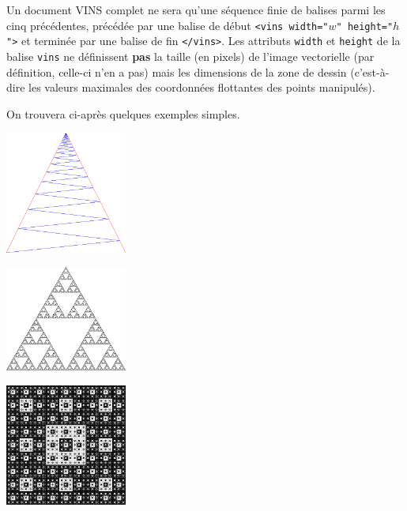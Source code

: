 \documentclass[10pt, a4paper]{article}
\begin{document}
Un document VINS complet ne sera qu'une séquence finie de balises
parmi les cinq précédentes, précédée par une balise de début
\texttt{<vins width="$w$" height="$h$">} et terminée par une balise de
fin \texttt{</vins>}. Les attributs \texttt{width} et \texttt{height}
de la balise \texttt{vins} ne définissent \textbf{pas} la taille (en pixels) de
l'image vectorielle (par définition, celle-ci n'en a pas) mais les
dimensions de la zone de dessin (c'est-à-dire les valeurs maximales des coordonnées flottantes des points manipulés).

On trouvera ci-après quelques exemples simples.

\begin{multicols}{2}


\hspace{3cm}\includegraphics[width=4cm]{zigzag.png}
\end{multicols}

\begin{multicols}{2}


\hspace{3cm}\includegraphics[width=4cm]{sierp.png}
\end{multicols}

\begin{multicols}{2}

%

\vspace{4cm}\hspace{3cm}\includegraphics[width=4cm]{bisierp.png}
\end{multicols}
\end{document}
